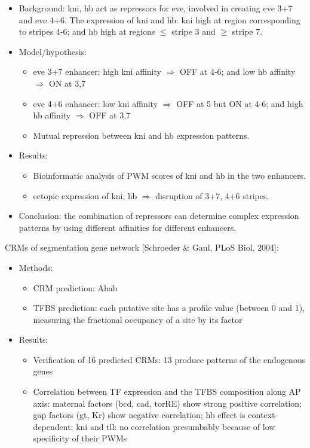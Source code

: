 \documentclass{report}
\begin{document}
\begin{enumerate}
\begin{itemize}
		\item Background: kni, hb act as repressors for eve, involved in creating eve 3+7 and eve 4+6. The expression of kni and hb: kni high at region corresponding to stripes 4-6; and hb high at regions $\leq$ stripe 3 and $\geq$ stripe 7. 
		
		\item Model/hypothesis: 
		\begin{itemize}
			\item eve 3+7 enhancer: high kni affinity $\Rightarrow$ OFF at 4-6; and low hb affinity $\Rightarrow$ ON at 3,7
			\item eve 4+6 enhancer: low kni affinity $\Rightarrow$ OFF at 5 but ON at 4-6; and high hb affinity $\Rightarrow$ OFF at 3,7
			\item Mutual repression between kni and hb expression patterns. 
		\end{itemize}
		
		\item Results:
		\begin{itemize}
			\item Bioinformatic analysis of PWM scores of kni and hb in the two enhancers. 
			\item ectopic expression of kni, hb $\Rightarrow$ disruption of 3+7, 4+6 stripes. 
		\end{itemize}
		
		\item Conclusion: the combination of repressors can determine complex expression patterns by using different affinities for different enhancers. 
	\end{itemize}
	
	CRMs of segmentation gene network [Schroeder \& Gaul, PLoS Biol, 2004]:
	\begin{itemize}
		\item Methods: 
		\begin{itemize}
			\item CRM prediction: Ahab
			\item TFBS prediction: each putative site has a profile value (between 0 and 1), measuring the fractional occupancy of a site by its factor
		\end{itemize}	
		
		\item Results: 
		\begin{itemize}
			\item Verification of 16 predicted CRMs: 13 produce patterns of the endogenous genes
			\item Correlation between TF expression and the TFBS composition along AP axis: maternal factors (bcd, cad, torRE) show strong positive correlation; gap factors (gt, Kr) show negative correlation; hb effect is context-dependent; kni and tll: no correlation presumbably because of low specificity of their PWMs 
		\end{itemize}	
		

\end{itemize}
\end{enumerate}
\end{document}
